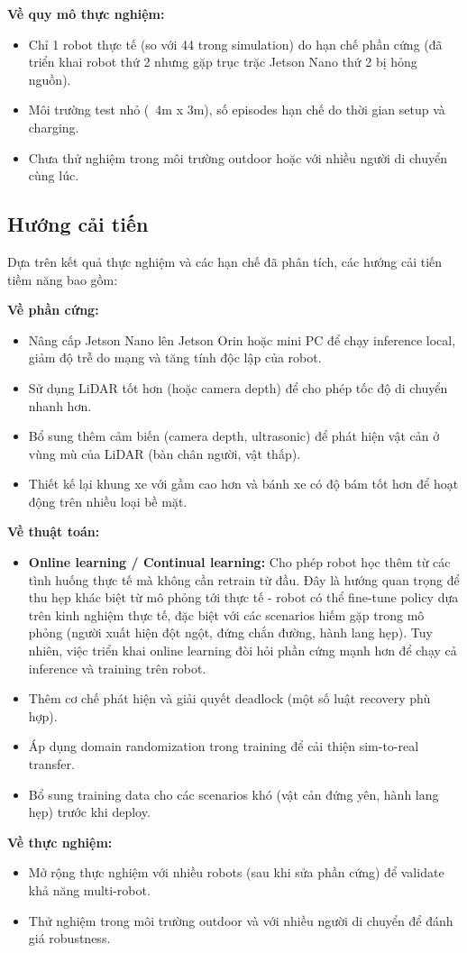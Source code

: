 \textbf{Về quy mô thực nghiệm:}
\begin{itemize}[nosep]
\item Chỉ 1 robot thực tế (so với 44 trong simulation) do hạn chế phần cứng (đã triển khai robot thứ 2 nhưng gặp trục trặc Jetson Nano thứ 2 bị hỏng nguồn).
\item Môi trường test nhỏ (~4m x 3m), số episodes hạn chế do thời gian setup và charging.
\item Chưa thử nghiệm trong môi trường outdoor hoặc với nhiều người di chuyển cùng lúc.
\end{itemize}

\subsection{Hướng cải tiến}

Dựa trên kết quả thực nghiệm và các hạn chế đã phân tích, các hướng cải tiến tiềm năng bao gồm:

\textbf{Về phần cứng:}
\begin{itemize}[nosep]
\item Nâng cấp Jetson Nano lên Jetson Orin hoặc mini PC để chạy inference local, giảm độ trễ do mạng và tăng tính độc lập của robot.
\item Sử dụng LiDAR tốt hơn (hoặc camera depth) để cho phép tốc độ di chuyển nhanh hơn.
\item Bổ sung thêm cảm biến (camera depth, ultrasonic) để phát hiện vật cản ở vùng mù của LiDAR (bàn chân người, vật thấp).
\item Thiết kế lại khung xe với gầm cao hơn và bánh xe có độ bám tốt hơn để hoạt động trên nhiều loại bề mặt.
\end{itemize}

\textbf{Về thuật toán:}
\begin{itemize}[nosep]
\item \textbf{Online learning / Continual learning:} Cho phép robot học thêm từ các tình huống thực tế mà không cần retrain từ đầu. Đây là hướng quan trọng để thu hẹp khác biệt từ mô phỏng tới thực tế - robot có thể fine-tune policy dựa trên kinh nghiệm thực tế, đặc biệt với các scenarios hiếm gặp trong mô phỏng (người xuất hiện đột ngột, đứng chắn đường, hành lang hẹp). Tuy nhiên, việc triển khai online learning đòi hỏi phần cứng mạnh hơn để chạy cả inference và training trên robot.
\item Thêm cơ chế phát hiện và giải quyết deadlock (một số luật recovery phù hợp).
\item Áp dụng domain randomization trong training để cải thiện sim-to-real transfer.
\item Bổ sung training data cho các scenarios khó (vật cản đứng yên, hành lang hẹp) trước khi deploy.
\end{itemize}

\textbf{Về thực nghiệm:}
\begin{itemize}[nosep]
\item Mở rộng thực nghiệm với nhiều robots (sau khi sửa phần cứng) để validate khả năng multi-robot.
\item Thử nghiệm trong môi trường outdoor và với nhiều người di chuyển để đánh giá robustness.
\end{itemize}
